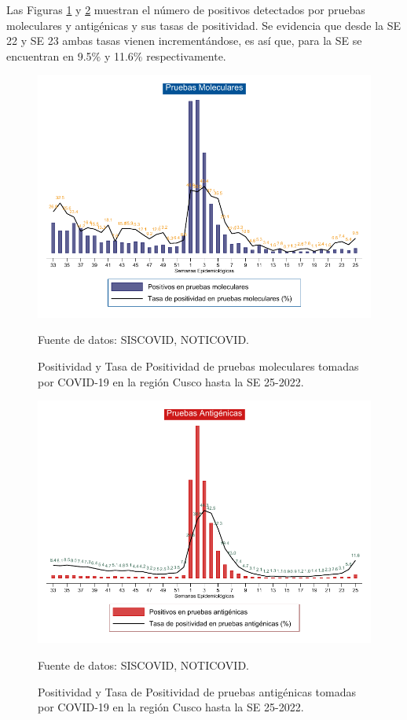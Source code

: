 \documentclass[12pt,a4paper,openany]{book}
\begin{document}
	
	
	Las Figuras \ref{fig:positividad_pcr} y \ref{fig:positividad_ag} muestran el número de positivos detectados por pruebas moleculares y antigénicas y sus tasas de positividad. Se evidencia que desde la SE 22 y SE 23 ambas tasas vienen incrementándose, es así que, para la SE se encuentran en 9.5$\%$ y 11.6$\%$ respectivamente.
	
	
	\begin{landscape}
		\begin{figure}[h]
			\caption{Positividad y Tasa de Positividad de pruebas moleculares tomadas por COVID-19 en la región Cusco hasta la SE 25-2022.}\label{fig:positividad_pcr}
			\begin{center}
				\includegraphics[width=0.90\linewidth]{../figuras/positividad_pcr.pdf}
			\end{center}
			{\footnotesize {Fuente de datos: SISCOVID, NOTICOVID.}}
		\end{figure}
	\end{landscape}
	\clearpage
	\begin{landscape}
		
		\begin{figure}[h]
			\caption{ Positividad y Tasa de Positividad de pruebas antigénicas tomadas por COVID-19 en la región Cusco hasta la SE 25-2022.}\label{fig:positividad_ag}
			\begin{center}
				\includegraphics[width=0.90\linewidth]{../figuras/positividad_ag.pdf}
			\end{center}
			{\footnotesize {Fuente de datos: SISCOVID, NOTICOVID.}}
		\end{figure}
	\end{landscape}
\end{document}

